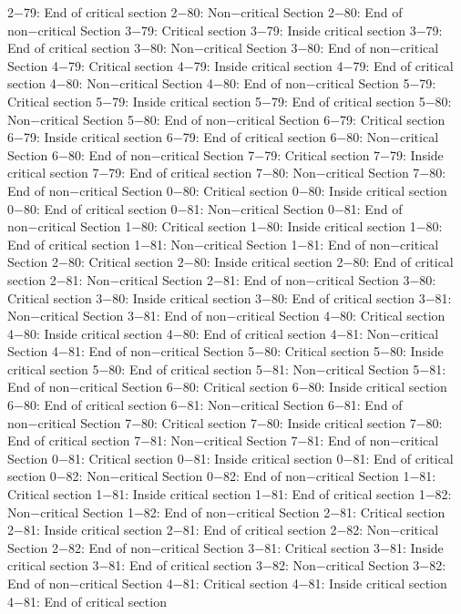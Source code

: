 2−79: End of critical section
2−80: Non−critical Section
2−80: End of non−critical Section
3−79: Critical section
3−79: Inside critical section
3−79: End of critical section
3−80: Non−critical Section
3−80: End of non−critical Section
4−79: Critical section
4−79: Inside critical section
4−79: End of critical section
4−80: Non−critical Section
4−80: End of non−critical Section
5−79: Critical section
5−79: Inside critical section
5−79: End of critical section
5−80: Non−critical Section
5−80: End of non−critical Section
6−79: Critical section
6−79: Inside critical section
6−79: End of critical section
6−80: Non−critical Section
6−80: End of non−critical Section
7−79: Critical section
7−79: Inside critical section
7−79: End of critical section
7−80: Non−critical Section
7−80: End of non−critical Section
0−80: Critical section
0−80: Inside critical section
0−80: End of critical section
0−81: Non−critical Section
0−81: End of non−critical Section
1−80: Critical section
1−80: Inside critical section
1−80: End of critical section
1−81: Non−critical Section
1−81: End of non−critical Section
2−80: Critical section
2−80: Inside critical section
2−80: End of critical section
2−81: Non−critical Section
2−81: End of non−critical Section
3−80: Critical section
3−80: Inside critical section
3−80: End of critical section
3−81: Non−critical Section
3−81: End of non−critical Section
4−80: Critical section
4−80: Inside critical section
4−80: End of critical section
4−81: Non−critical Section
4−81: End of non−critical Section
5−80: Critical section
5−80: Inside critical section
5−80: End of critical section
5−81: Non−critical Section
5−81: End of non−critical Section
6−80: Critical section
6−80: Inside critical section
6−80: End of critical section
6−81: Non−critical Section
6−81: End of non−critical Section
7−80: Critical section
7−80: Inside critical section
7−80: End of critical section
7−81: Non−critical Section
7−81: End of non−critical Section
0−81: Critical section
0−81: Inside critical section
0−81: End of critical section
0−82: Non−critical Section
0−82: End of non−critical Section
1−81: Critical section
1−81: Inside critical section
1−81: End of critical section
1−82: Non−critical Section
1−82: End of non−critical Section
2−81: Critical section
2−81: Inside critical section
2−81: End of critical section
2−82: Non−critical Section
2−82: End of non−critical Section
3−81: Critical section
3−81: Inside critical section
3−81: End of critical section
3−82: Non−critical Section
3−82: End of non−critical Section
4−81: Critical section
4−81: Inside critical section
4−81: End of critical section
